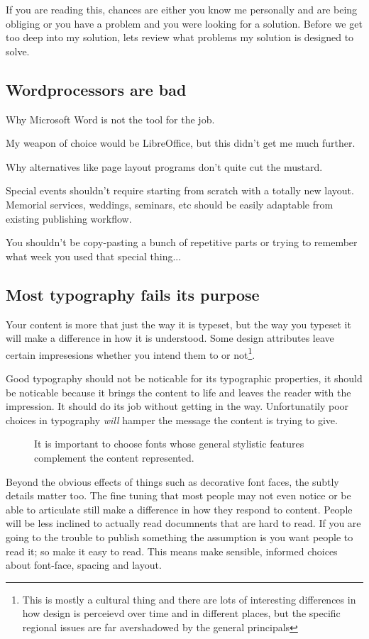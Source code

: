 \documentclass[12pt]{scrartcl}
\newcommand{\pdfsample}[4]{%
		\begin{figure}[h]
			\centering
			\begin{minipage}[b]{.45\textwidth}
				\raggedleft
				\shadowbox{\texttt{[image: \#2]}}
			\end{minipage}\hspace{2\columnsep}
			\begin{minipage}[b]{.45\textwidth}
				\caption{#3}
				\label{fig:#4}
				\vspace{1ex}
			\end{minipage}
		\end{figure}
	}
\begin{document}
If you are reading this, chances are either you know me personally and are being
obliging or you have a problem and you were looking for a solution. Before we
get too deep into my solution, lets review what problems my solution is designed
to solve.

\subsection{Wordprocessors are bad}

Why Microsoft Word is not the tool for the job.

My weapon of choice would be LibreOffice, but this didn't get me much further.

Why alternatives like page layout programs don't quite cut the mustard.

Special events shouldn't require starting from scratch with a totally new
layout. Memorial services, weddings, seminars, etc should be easily adaptable
from existing publishing workflow.

You shouldn't be copy-pasting a bunch of repetitive parts or trying to remember
what week you used that special thing...

\subsection{Most typography fails its purpose}

Your content is more that just the way it is typeset, but the way you typeset it
will make a difference in how it is understood. Some design attributes leave
certain impresesions whether you intend them to or not\footnote{This is mostly a
	cultural thing and there are lots of interesting differences in how
	design is perceievd over time and in different places, but the specific
	regional issues are far avershadowed by the general principals}.

Good typography should not be noticable for its typographic properties, it
should be noticable because it brings the content to life and leaves the reader
with the impression. It should do its job without getting in the way.
Unfortunatily poor choices in typography \emph{will} hamper the message the
content is trying to give.


\pdfsample{2}{../gallery/fontsmatter.pdf}{It is important to choose fonts whose general stylistic features complement the content represented.}{fontsmatter2}

Beyond the obvious effects of things such as decorative font faces, the subtly
details matter too. The fine tuning that most people may not even notice or be
able to articulate still make a difference in how they respond to content.
People will be less inclined to actually read documnents that are hard to read.
If you are going to the trouble to publish something the assumption is you want
people to read it; so make it easy to read. This means make sensible, informed
choices about font-face, spacing and layout.
\end{document}
